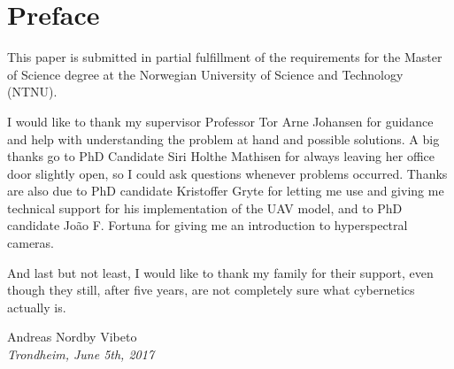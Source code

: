 \chapter*{Preface}

\vspace{1cm}

This paper is submitted in partial fulfillment of the requirements for the Master of Science degree at the Norwegian University of Science and Technology (NTNU).

I would like to thank my supervisor Professor Tor Arne Johansen for guidance and help with understanding the problem at hand and possible solutions. A big thanks go to PhD Candidate Siri Holthe Mathisen for always leaving her office door slightly open, so I could ask questions whenever problems occurred. Thanks are also due to PhD candidate Kristoffer Gryte for letting me use and giving me technical support for his implementation of the UAV model, and to PhD candidate João F. Fortuna for giving me an introduction to hyperspectral cameras.

And last but not least, I would like to thank my family for their support, even though they still, after five years, are not completely sure what cybernetics actually is.

\vspace{2cm}

\begin{center}
    Andreas Nordby Vibeto \\
    \emph{Trondheim, June 5th, 2017}
\end{center}